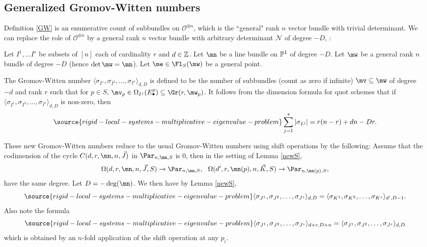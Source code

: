  \subsection{Generalized Gromov-Witten numbers}\label{stuffed}
 Definition \ref{GW} is an enumerative count of subbundles on $\mathcal{O}^{\oplus n}$, which is the ``general" rank $n$ vector bundle with trivial determinant. We can replace the role of $\mathcal{O}^{\oplus n}$ by a general rank $n$ vector bundle
with arbitrary determinant $\mathcal{N}$ of degree $-D$, \cite[Definition 2.4]{BHorn}:
\begin{defi}
\notready\label{GWgen}
Let $I^1,\dots I^s$ be subsets of $[n]$ each of cardinality $r$ and $d\in\Bbb{Z}$. Let $\mn$ be a line bundle on $\Bbb{P}^1$
of degree $-D$.  Let $\mw$ be a general rank $n$ bundle of degree $-D$ (hence $\det\mw=\mn$).  Let $\me\in\Fl_S(\mw)$ be a general point.

The Gromov-Witten number $\langle\sigma_{I^1}, \sigma_{I^2},\dots,\sigma_{I^s}\rangle_{d,D}$
is defined to be the number of subbundles (count as zero if infinite) $\mv\subseteq \mw$ of degree $-d$ and rank $r$  such that for $p\in S$,
$\mv_p\in\Omega_{I^j}(E^p_{\bullet})\subseteq \Gr(r,\mw_p)$. It follows from the dimension formula for quot schemes that
 if $\langle\sigma_{I^1}, \sigma_{I^2},\dots,\sigma_{I^s}\rangle_{d,D}$ is non-zero, then
 \begin{equation}\label{numerical}
\source{rigid-local-systems-multiplicative-eigenvalue-problem}
 \sum_{j=1}^s |\sigma_{I^j}| =r(n-r)+dn-Dr.
 \end{equation}

\end{defi}
These new Gromov-Witten numbers reduce to the usual Gromov-Witten numbers using shift operations by the following:
Assume that the  codimension of the cycle $C(d,r,\mn,n,\vec{J})$ in $\Par_{n,\mn,S}$ is $0$, then in the setting of Lemma \ref{newS},
$$\Omega(d,r,\mn,n,\vec{J},S)\to \Par_{n,\mn,S}, \ \ \Omega(d',r,\mn(p),n,\vec{K},S)\to \Par_{n,\mn(p),S},$$
 have the same degree. Let $D=-\deg(\mn)$. We then have by Lemma \ref{newS},
\begin{equation}\label{formula1}
\source{rigid-local-systems-multiplicative-eigenvalue-problem}
\langle\sigma_{J^1}, \sigma_{J^2},\dots,\sigma_{J^s}\rangle_{d,D}= \langle\sigma_{K^1}, \sigma_{K^2},\dots,\sigma_{K^s}\rangle_{d',D-1}.
\end{equation}
Also note the formula
\begin{equation}\label{formula2}
\source{rigid-local-systems-multiplicative-eigenvalue-problem}
\langle\sigma_{J^1}, \sigma_{J^2},\dots,\sigma_{J^s}\rangle_{d+r,D+n}=\langle\sigma_{J^1}, \sigma_{J^2},\dots,\sigma_{J^s}\rangle_{d,D}
\end{equation}
 which is obtained by an $n$-fold application of the shift operation at any $p_i$.

